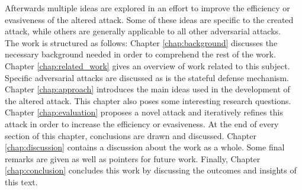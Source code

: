 Afterwards multiple ideas are explored in an effort to improve the efficiency or evasiveness of the altered attack. Some of these ideas are specific to the created attack, while others are generally applicable to all other adversarial attacks.\\

The work is structured as follows: Chapter \ref{chap:background} discusses the necessary background needed in order to comprehend the rest of the work. Chapter \ref{chap:related_work} gives an overview of work related to this subject. Specific adversarial attacks are discussed as is the stateful defense mechanism. Chapter \ref{chap:approach} introduces the main ideas used in the development of the altered attack. This chapter also poses some interesting research questions. Chapter \ref{chap:evaluation} proposes a novel attack and iteratively refines this attack in order to increase the efficiency or evasiveness. At the end of every section of this chapter, conclusions are drawn and discussed. Chapter \ref{chap:discussion} contains a discussion about the work as a whole. Some final remarks are given as well as pointers for future work.  Finally, Chapter \ref{chap:conclusion} concludes this work by discussing the outcomes and insights of this text.

